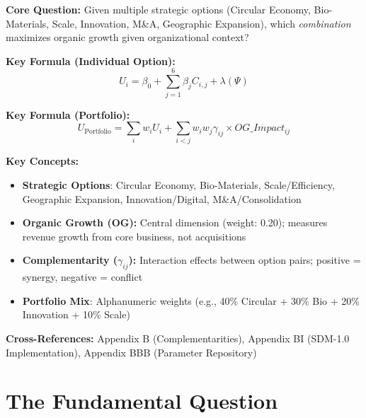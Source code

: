 \begin{tcolorbox}[colback=blue!5!white, colframe=blue!75!black,
    title=Quick Reference: Strategy Option Comparison Model v1.0]

\textbf{Core Question:} Given multiple strategic options (Circular Economy, Bio-Materials, Scale, Innovation, M\&A, Geographic Expansion), which \textit{combination} maximizes organic growth given organizational context?

\textbf{Key Formula (Individual Option):}
\begin{equation}
U_i = \beta_0 + \sum_{j=1}^{6} \beta_j C_{i,j} + \lambda(\Psi)
\end{equation}

\textbf{Key Formula (Portfolio):}
\begin{equation}
U_{\text{Portfolio}} = \sum_{i} w_i U_i + \sum_{i<j} w_i w_j \gamma_{ij} \times OG\_Impact_{ij}
\end{equation}

\textbf{Key Concepts:}
\begin{itemize}[nosep]
\item \textbf{Strategic Options}: Circular Economy, Bio-Materials, Scale/Efficiency, Geographic Expansion, Innovation/Digital, M\&A/Consolidation
\item \textbf{Organic Growth (OG):} Central dimension (weight: 0.20); measures revenue growth from core business, not acquisitions
\item \textbf{Complementarity ($\gamma_{ij}$):} Interaction effects between option pairs; positive = synergy, negative = conflict
\item \textbf{Portfolio Mix}: Alphanumeric weights (e.g., 40\% Circular + 30\% Bio + 20\% Innovation + 10\% Scale)
\end{itemize}

\textbf{Cross-References:} Appendix B (Complementarities), Appendix BI (SDM-1.0 Implementation), Appendix BBB (Parameter Repository)

\end{tcolorbox}


\section{The Fundamental Question}
\label{sec:socm-fundamental}

